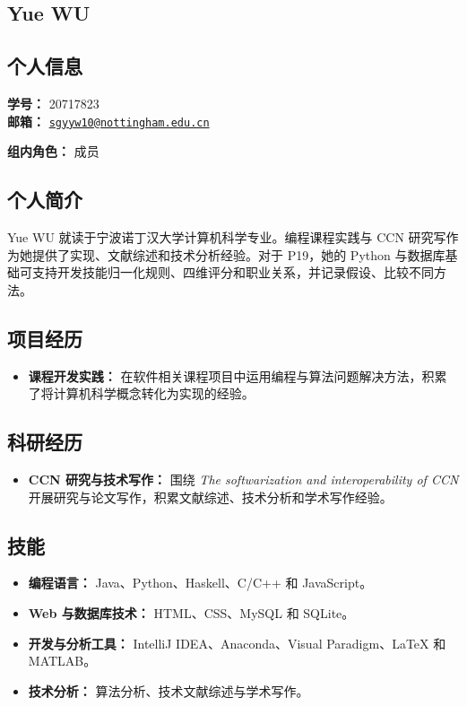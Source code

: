 \documentclass[a4paper,12pt]{article}
\newcommand{\PersonalInformation}[2]{%
  \subsection*{个人信息}
  \if\relax\detokenize{#1}\relax\else
  \noindent\textbf{学号：} #1\\
  \fi
  \textbf{邮箱：} #2\par
}
\begin{document}
\subsection{Yue WU}
\PersonalInformation{20717823}{\href{mailto:sgyyw10@nottingham.edu.cn}{\nolinkurl{sgyyw10@nottingham.edu.cn}}}
\noindent\textbf{组内角色：} 成员\par

\subsection*{个人简介}
Yue WU 就读于宁波诺丁汉大学计算机科学专业。编程课程实践与 CCN 研究写作为她提供了实现、文献综述和技术分析经验。对于 P19，她的 Python 与数据库基础可支持开发技能归一化规则、四维评分和职业关系，并记录假设、比较不同方法。

\subsection*{项目经历}
\begin{itemize}
  \item \textbf{课程开发实践：} 在软件相关课程项目中运用编程与算法问题解决方法，积累了将计算机科学概念转化为实现的经验。
\end{itemize}

\subsection*{科研经历}
\begin{itemize}
  \item \textbf{CCN 研究与技术写作：} 围绕 \emph{The softwarization and interoperability of CCN} 开展研究与论文写作，积累文献综述、技术分析和学术写作经验。
\end{itemize}

\subsection*{技能}
\begin{itemize}
  \item \textbf{编程语言：} Java、Python、Haskell、C/C++ 和 JavaScript。
  \item \textbf{Web 与数据库技术：} HTML、CSS、MySQL 和 SQLite。
  \item \textbf{开发与分析工具：} IntelliJ IDEA、Anaconda、Visual Paradigm、LaTeX 和 MATLAB。
  \item \textbf{技术分析：} 算法分析、技术文献综述与学术写作。
\end{itemize}
\end{document}
